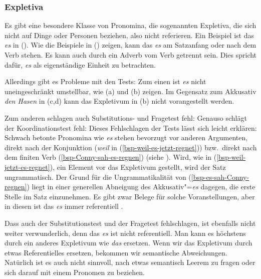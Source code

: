 \subsubsection{Expletiva}

Es gibt eine besondere Klasse von Pronomina, die sogenannten Expletiva, die sich nicht
auf Dinge oder Personen beziehen, also nicht referieren. Ein Beispiel ist das \emph{es} in
().
\eal
{}
\zl
Wie die Beispiele in () zeigen, kann das \emph{es} am Satzanfang
oder nach dem Verb stehen. Es kann auch durch ein Adverb vom Verb getrennt sein.
Dies spricht dafür, \emph{es} als eigenständige Einheit zu betrachten.

Allerdings gibt es Probleme mit den Tests: Zum einen ist \emph{es} nicht
uneingeschränkt umstellbar, wie (a) und (b) zeigen.
\eal
{}
\zl
\eal
{}
\zl
Im Gegensatz zum Akkusativ \emph{den Hasen} in (c,d) kann das Expletivum in (b) nicht
vorangestellt werden.

Zum anderen schlagen auch Substitutions- und Fragetest fehl:
\eal
{}
\zl
Genauso schlägt der Koordinationstest fehl:
\z
Dieses Fehlschlagen der Tests lässt sich leicht erklären: Schwach betonte
Pronomina wie \emph{es} stehen bevorzugt vor anderen Argumenten, direkt nach
der Konjunktion (\emph{weil} in (\ref{bsp-weil-es-jetzt-regnet})) bzw.\
direkt nach dem finiten Verb (\ref{bsp-Conny-sah-es-regnen}) (siehe \citealt[]{Abraham95a-u}). Wird, wie
in (\ref{bsp-weil-jetzt-es-regnet}), ein Element vor das Expletivum gestellt,
wird der Satz ungrammatisch. Der Grund für die Ungrammatikalität von
(\ref{bsp-es-sah-Conny-regnen}) liegt in einer generellen Abneigung des 
Akkusativ"=\emph{es} dagegen, die erste Stelle im Satz einzunehmen. Es gibt zwar Belege für
solche Voranstellungen, aber in diesen ist das \emph{es} immer referentiell \parencites[]{Lenerz94a}[]{GS97a}.

%
Dass auch der Substitutionstest und der Fragetest fehlschlagen, ist ebenfalls
nicht weiter verwunderlich, denn das \emph{es} ist nicht referentiell.
Man kann es höchstens durch ein anderes Expletivum wie \emph{das} ersetzen.
Wenn wir das Expletivum durch etwas Referentielles ersetzen, bekommen wir semantische Abweichungen.
Natürlich ist es auch nicht sinnvoll, nach etwas semantisch Leerem zu fragen oder
sich darauf mit einem Pronomen zu beziehen.


